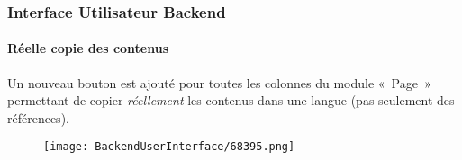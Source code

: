 \begin{frame}[fragile]
	\frametitle{Interface Utilisateur Backend}
	\framesubtitle{Réelle copie des contenus}

	Un nouveau bouton est ajouté pour toutes les colonnes du module «~Page~» permettant de copier
	\textit{réellement} les contenus dans une langue (pas seulement des références).

	\begin{figure}
		\texttt{[image: BackendUserInterface/68395.png]}
	\end{figure}

\end{frame}


